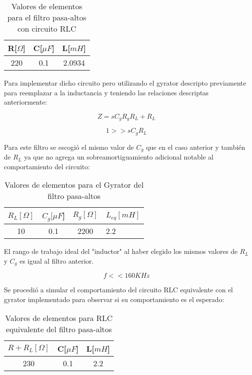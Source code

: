 \begin{table}[H]
    \centering
    \begin{tabular}{|c|c|c|}
    \hline
    \rowcolor[HTML]{C0C0C0} 
    R[$\Omega$] & C[$\mu F$] & L[$mH$]  \\ \hline
    220     & 0.1  & 2.0934 \\ \hline
    \end{tabular}
    \caption{Valores de elementos para el filtro pasa-altos con circuito RLC}
    \end{table}

Para implementar dicho circuito pero utilizando el gyrator descripto previamente
para reemplazar a la inductancia y teniendo las relaciones descriptas anteriormente:

$$Z=sC_gR_gR_L+R_L$$

$$1 >> sC_gR_L$$

Para este filtro se escogió el mismo valor de $C_g$ que en el caso anterior y también de $R_L$ ya que no agrega un sobreamortiguamiento
adicional notable al comportamiento del circuito:

\begin{table}[H]
    \centering
    \begin{tabular}{|c|c|c|l|}
    \hline
    \rowcolor[HTML]{C0C0C0} 
    $R_L[\Omega]$ & $C_g[\mu F$] & $R_g[\Omega]$  & $L_{eq}[mH]$ \\ \hline
    10      & 0.1  & 2200 & 2.2        \\ \hline
    \end{tabular}
    \caption{Valores de elementos para el Gyrator del filtro pasa-altos}
    \end{table}


El rango de trabajo ideal del "inductor" al haber elegido los mismos valores de $R_L$ y $C_g$ es igual al filtro anterior.

$$f << 160 KHz$$

Se procedió a simular el comportamiento del circuito RLC equivalente con el gyrator implementado para observar si su comportamiento es el esperado:

\begin{table}[H]
    \centering
    \begin{tabular}{|c|c|c|}
    \hline
    \rowcolor[HTML]{C0C0C0} 
    $R+R_L[\Omega]$ & C[$\mu F$] & L[$mH$]  \\ \hline
    230      & 0.1  & 2.2 \\ \hline
    \end{tabular}
    \caption{Valores de elementos para RLC equivalente del filtro pasa-altos}
    \end{table}


